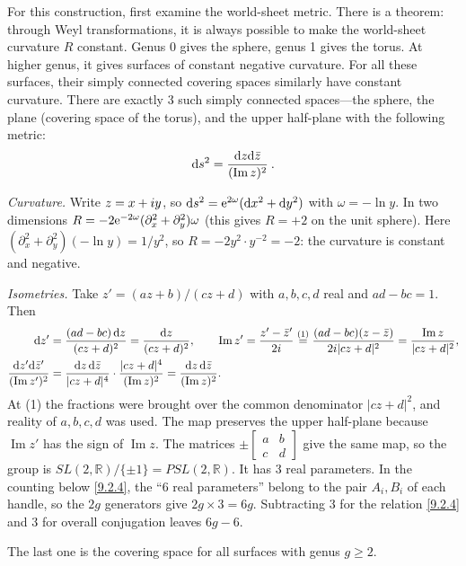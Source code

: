For this construction, first examine the world-sheet metric. There is a theorem: through Weyl transformations, it is always possible to make the world-sheet curvature $R$ constant. Genus 0 gives the sphere, genus 1 gives the torus. 
At higher genus, it gives surfaces of constant negative curvature. For all these surfaces, their simply connected covering spaces similarly have constant curvature. There are exactly 3 such simply connected spaces—the sphere, the plane (covering space of the torus), and the upper half-plane with the following metric:
\begin{equation}
	\mathrm{d} s^{2}=\frac{\mathrm{d} z \mathrm{d} \bar{z}}{(\operatorname{Im} z)^{2}} \:.
	\label{9.2.3}
\end{equation}
\begin{tcolorbox}[breakable]
	\begin{remark}
		\emph{Curvature.} Write $z=x+i y$, so $\mathrm{d} s^2=\mathrm{e}^{2\omega}(\mathrm{d} x^2+\mathrm{d} y^2)$ with $\omega=-\ln y$. In two dimensions $R=-2\mathrm{e}^{-2\omega}(\partial_x^2+\partial_y^2)\omega$ (this gives $R=+2$ on the unit sphere). Here $(\partial_x^2+\partial_y^2)(-\ln y)=1/y^2$, so $R=-2y^2\cdot y^{-2}=-2$: the curvature is constant and negative.

		\emph{Isometries.} Take $z'=(az+b)/(cz+d)$ with $a,b,c,d$ real and $ad-bc=1$. Then
		\begin{align*}
			\mathrm{d} z'&=\frac{(ad-bc)\,\mathrm{d} z}{(cz+d)^2}=\frac{\mathrm{d} z}{(cz+d)^2},\qquad
			\operatorname{Im}z'=\frac{z'-\bar z'}{2i}\overset{(1)}{=}\frac{(ad-bc)(z-\bar z)}{2i|cz+d|^2}=\frac{\operatorname{Im}z}{|cz+d|^2},\\
			\frac{\mathrm{d} z'\mathrm{d}\bar z'}{(\operatorname{Im}z')^2}&=\frac{\mathrm{d} z\,\mathrm{d}\bar z}{|cz+d|^4}\cdot\frac{|cz+d|^4}{(\operatorname{Im}z)^2}=\frac{\mathrm{d} z\,\mathrm{d}\bar z}{(\operatorname{Im}z)^2}.
		\end{align*}
		At (1) the fractions were brought over the common denominator $|cz+d|^2$, and reality of $a,b,c,d$ was used. The map preserves the upper half-plane because $\operatorname{Im}z'$ has the sign of $\operatorname{Im}z$. The matrices $\pm\begin{bmatrix}a&b\\c&d\end{bmatrix}$ give the same map, so the group is $SL(2,\mathds R)/\{\pm1\}=PSL(2,\mathds R)$. It has 3 real parameters. In the counting below \eqref{9.2.4}, the ``6 real parameters'' belong to the pair $A_i,B_i$ of each handle, so the $2g$ generators give $2g\times3=6g$. Subtracting 3 for the relation \eqref{9.2.4} and 3 for overall conjugation leaves $6g-6$.
	\end{remark}
\end{tcolorbox}
The last one is the covering space for all surfaces with genus $g \geq 2$.

